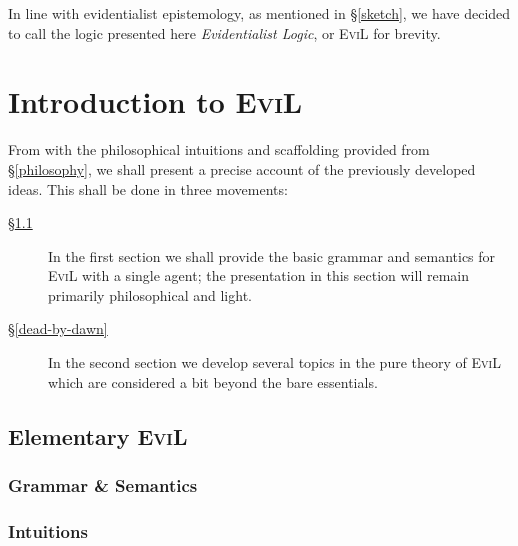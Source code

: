 \documentclass[11pt]{article}
\numberwithin{equation}{subsection}
\begin{document}
In line with evidentialist epistemology, as mentioned in
\S\ref{sketch}, we have decided to call the logic presented here
\emph{Evidentialist Logic}, or \textsc{EviL} for brevity.

\section{Introduction to \textsc{EviL}}\label{evil-semantics}
From with the philosophical intuitions and scaffolding provided from
\S\ref{philosophy}, we shall present a precise account of the previously
developed ideas.  This shall be done in three movements:
\begin{description}
 \item[\S\ref{basic-evil}]  In the first section we shall provide the
   basic grammar and semantics for \textsc{EviL} with a single agent;
   the presentation in this section will remain primarily
   philosophical and light.
 \item[\S\ref{dead-by-dawn}]  In the second section we develop several
   topics in the pure theory of \textsc{EviL} which are considered a bit
   beyond the bare essentials.
\end{description}


\subsection{Elementary \textsc{EviL}}\label{basic-evil}
\subsubsection{Grammar \& Semantics}\label{evil-grammar}

\subsubsection{Intuitions}\label{evil-intuition}

\end{document}
